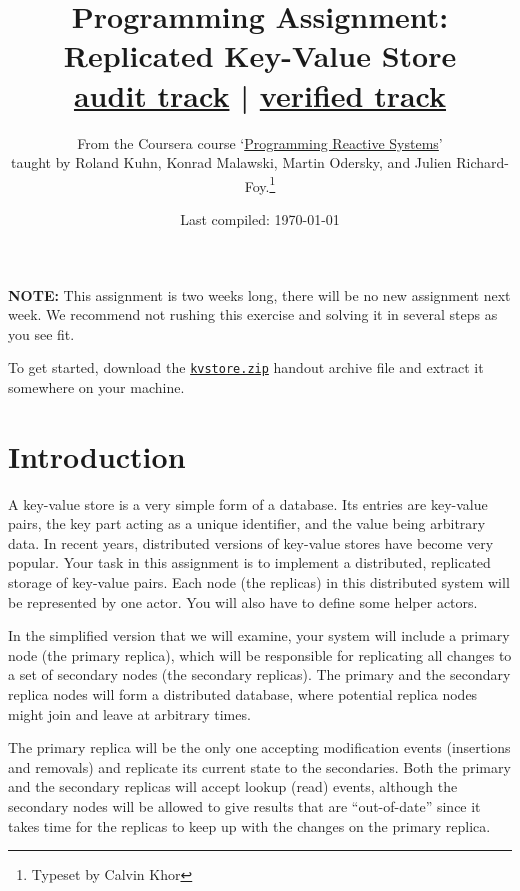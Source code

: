 \documentclass{article}
\begin{document}
\title{Programming Assignment: Replicated Key-Value Store \\ \small \href{https://www.coursera.org/learn/scala-akka-reactive/programming/dt8Ku/replicated-key-value-store-audit-track}{audit track} | \href{https://www.coursera.org/learn/scala-akka-reactive/programming/cVXJU/replicated-key-value-store-verified-track}{verified track} }
\author{   From the Coursera course `\href{https://www.coursera.org/learn/scala-akka-reactive/home/welcome}{Programming Reactive Systems}' \\ taught by Roland Kuhn, Konrad Malawski, Martin Odersky, and Julien Richard-Foy.\footnote{Typeset by Calvin Khor}  }

\date{Last compiled: \today}
\maketitle
\tableofcontents
\newpage 
\textbf{NOTE:} This assignment is two weeks long, there will  be no new assignment next week. We recommend not rushing this exercise  and solving it in several steps as you see fit.

To get started,
download the \href{https://moocs.scala-lang.org/~dockermoocs/handouts/scala-3/kvstore.zip}{\texttt{kvstore.zip}}
handout archive file and extract it somewhere on your machine.

\section{Introduction}\label{s:intro}
A key-value store is a very simple form of a database. Its entries are key-value pairs, the key part acting as a unique identifier, and the value being arbitrary data. In recent years, distributed versions of key-value stores have become very popular. Your task in this assignment is to implement a distributed, replicated storage of key-value pairs. Each node (the replicas) in this distributed system will be represented by one actor. You will also have to define some helper actors.

In the simplified version that we will examine, your system will include a primary node (the primary replica), which will be responsible for replicating all changes to a set of secondary nodes (the secondary replicas). The primary and the secondary replica nodes will form a distributed database, where potential replica nodes might join and leave at arbitrary times.

The primary replica will be the only one accepting modification events (insertions and removals) and replicate its current state to the secondaries. Both the primary and the secondary replicas will accept lookup (read) events, although the secondary nodes will be allowed to give results that are ``out-of-date'' since it takes time for the replicas to keep up with the changes on the primary replica.
\end{document}
